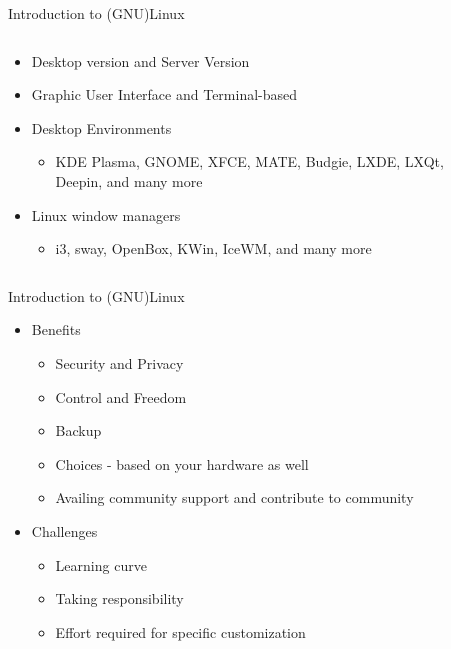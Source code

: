 \documentclass[aspectratio=169,10pt]{beamer}
\begin{document}
    \begin{frame}{Introduction to (GNU)Linux}
        \begin{columns}
            \begin{column}{0.5\textwidth} 
                \begin{itemize}
                    \item Desktop version and Server Version 
                    \item Graphic User Interface and Terminal-based
                    \item Desktop Environments
                    \begin{itemize}
                        \item KDE Plasma, GNOME,  XFCE, MATE, Budgie, LXDE, LXQt, Deepin, and many more
                    \end{itemize}
                    \item Linux window managers
                    \begin{itemize}
                         \item i3, sway, OpenBox, KWin, IceWM, and many more
                    \end{itemize}  

                \end{itemize}
            \end{column}
            \begin{column}{0.5\textwidth} 
                
            \end{column}
        \end{columns}   
    \end{frame}

    \begin{frame}{Introduction to (GNU)Linux}
       \begin{itemize}
            \item Benefits
            \begin{itemize}
                \item Security and Privacy
                \item Control and Freedom
                \item Backup
                \item Choices - based on your hardware as well
                \item Availing community support and contribute to community
            \end{itemize}
            \item Challenges
            \begin{itemize}
                 \item Learning curve
                 \item Taking responsibility
                 \item Effort required for specific customization
            \end{itemize}  
        \end{itemize}
    \end{frame}
\end{document}
